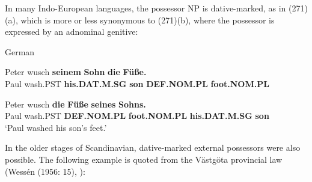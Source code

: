 
In many Indo-European languages, the possessor NP is dative-marked, as in (271)(a), which is more or less synonymous to (271)(b), where the possessor is expressed by an adnominal genitive:


\item 

\label{bkm:Ref95294441}German



\item 


 \ea\label{}
\gll Peter  wusch  \textbf{seinem}\textbf{  Sohn}\textbf{  die}\textbf{  Füße.}\\


Paul  wash.PST  \textbf{his.DAT.M.SG}\textbf{  son}\textbf{  DEF.NOM.PL}\textbf{  foot.NOM.PL}\\

\item 


 \ea\label{}
\gll Peter  wusch  \textbf{die}\textbf{  Füße}\textbf{  seines}\textbf{  Sohns.}\\


Paul  wash.PST  \textbf{DEF.NOM.PL}\textbf{  foot.NOM.PL}\textbf{  his.DAT.M.SG}\textbf{  son}\\

\glt ‘Paul washed his son’s feet.’

\z

In the older stages of Scandinavian, dative-marked external possessors were also possible. The following example is quoted from the Västgöta provincial law (Wessén (1956: 15), \citet[212]{Norde1997}): 

